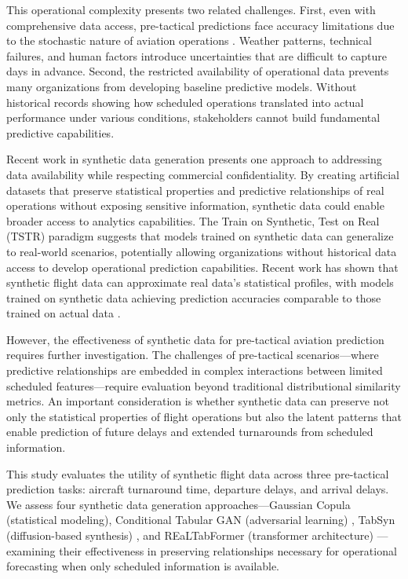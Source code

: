 \documentclass[conference]{IEEEtran}
\begin{document}
This operational complexity presents two related challenges. First, even with comprehensive data access, pre-tactical predictions face accuracy limitations due to the stochastic nature of aviation operations \cite{dalmau2024probabilistic}. Weather patterns, technical failures, and human factors introduce uncertainties that are difficult to capture days in advance. Second, the restricted availability of operational data prevents many organizations from developing baseline predictive models. Without historical records showing how scheduled operations translated into actual performance under various conditions, stakeholders cannot build fundamental predictive capabilities.



Recent work in synthetic data generation presents one approach to addressing data availability while respecting commercial confidentiality. By creating artificial datasets that preserve statistical properties and predictive relationships of real operations without exposing sensitive information, synthetic data could enable broader access to analytics capabilities. The Train on Synthetic, Test on Real (TSTR) paradigm \cite{esteban2017real} suggests that models trained on synthetic data can generalize to real-world scenarios, potentially allowing organizations without historical data access to develop operational prediction capabilities. Recent work has shown that synthetic flight data can approximate real data's statistical profiles, with models trained on synthetic data achieving prediction accuracies comparable to those trained on actual data \cite{aly2025synthetic}.


However, the effectiveness of synthetic data for pre-tactical aviation prediction requires further investigation. The challenges of pre-tactical scenarios—where predictive relationships are embedded in complex interactions between limited scheduled features—require evaluation beyond traditional distributional similarity metrics. An important consideration is whether synthetic data can preserve not only the statistical properties of flight operations but also the latent patterns that enable prediction of future delays and extended turnarounds from scheduled information.


This study evaluates the utility of synthetic flight data across three pre-tactical prediction tasks: aircraft turnaround time, departure delays, and arrival delays. We assess four synthetic data generation approaches—Gaussian Copula (statistical modeling), Conditional Tabular GAN (adversarial learning) \cite{xu2019modeling}, TabSyn (diffusion-based synthesis) \cite{zhang2024mixed}, and REaLTabFormer (transformer architecture) \cite{solatorio2023realtabformer}—examining their effectiveness in preserving relationships necessary for operational forecasting when only scheduled information is available.
\end{document}
